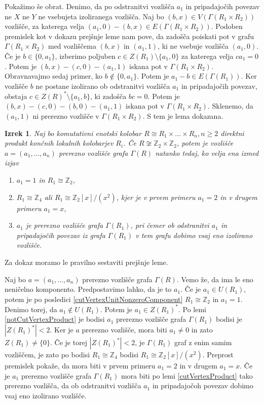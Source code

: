 \documentclass[a4paper, 12pt]{amsart}
\theoremstyle{definition} %
\theoremstyle{plain} %
\newtheorem{izrek}[definicija]{Izrek}
\newcommand{\Z}{\mathbb Z}
\begin{document}
Pokažimo še obrat. Denimo, da po odstranitvi vozlišča $a_1$ in pripadajočih povezav ne $X$ ne $Y$ ne vsebujeta izoliranega vozlišča. Naj bo $(b,x)\in V(\Gamma(R_1\times R_2))$ vozlišče, za katerega velja $(a_1,0) -(b,x) \in E(\Gamma(R_1\times R_2))$. Podoben premislek kot v dokazu prejšnje leme nam pove, da zadošča poiskati pot  v grafu $\Gamma(R_1 \times R_2)$ med vozliščema $(b,x)$ in $(a_1,1)$, ki ne vsebuje vozlišča $(a_1,0)$. Če je $b\in \{0,a_1\}$, izberimo poljuben $c\in Z(R_1) \setminus \{a_1,0\}$ za katerega velja $ca_1 = 0$. Potem je $(b,x) - (c,0) - (a_1,1)$ iskana pot v $\Gamma(R_1 \times R_2)$. Obravnavajmo sedaj primer, ko $b\notin \{0,a_1\}$. Potem je $a_1 -b\in E(\Gamma(R_1))$. Ker vozlišče $b$ ne postane izolirano ob odstranitvi vozlišča $a_1$ in pripadajočih povezav, obstaja $c\in Z(R)^*\setminus\{a_1,b\}$, ki zadošča $bc=0$. Potem je $(b,x)-(c,0)-(b,0)-(a_1,1)$ iskana pot v $\Gamma(R_1\times R_2)$. Sklenemo, da $(a_1,1)$  ni prerezno vozlišče v $\Gamma(R_1 \times R_2)$. S tem je lema dokazana. 
\endproof

\begin{izrek}
\label{cutVertexClassification}
Naj bo komutativni enotski kolobar $R\cong R_1\times \dots \times R_n, n\ge2$ direktni produkt končnih lokalnih kolobarjev $R_i$. Če $R\not\cong \Z_2 \times \Z_2$, potem je vozlišče $a=(a_1,\dots,a_n)$ prerezno vozlišče grafa $\Gamma(R)$ natanko tedaj, ko velja ena izmed  izjav
\begin{enumerate}
\item $a_1=1$ in $R_1 \cong \Z_2$,
\item $R_1\cong \Z_4$ ali $R_1\cong \Z_2[x]/(x^2)$, kjer je v prvem primeru $a_1=2$ in v drugem primeru $a_1 = x$,
\item $a_1$ je prerezno vozlišče grafa $\Gamma(R_1)$, pri čemer ob odstranitvi $a_1$ in pripadajočih povezav iz grafa $\Gamma(R_1)$ v tem grafu dobimo vsaj eno izolirano vozlišče.
\end{enumerate}
\end{izrek}

\proof
Za dokaz moramo le pravilno sestaviti prejšnje leme.

Naj bo $a=(a_1,\dots,a_n)$ prerezno vozlišče grafa $\Gamma(R)$. Vemo že, da ima le eno neničelno komponento. Predpostavimo lahko, da je to $a_1$. Če je $a_1\in U(R_1)$, potem je po posledici  \ref{cutVertexUnitNonzeroComponent} $R_1\cong \Z_2$ in $a_1 = 1$. Denimo torej, da $a_1 \notin U(R_1)$. Potem je $a_1 \in Z(R_1)^*$. Po lemi \ref{notCutVertexProduct} je bodisi $a_1$ prerezno vozlišče grafa $\Gamma(R_1)$ bodisi je $|Z(R_1)^*| < 2$. Ker je $a$ prerezno vozlišče, mora biti $a_1\neq 0$ in zato $Z(R_1) \neq \{0\}$. Če je torej $|Z(R_1)^*| < 2$, je $\Gamma(R_1)$ graf z enim samim vozliščem, je  zato po \cite{Anderson-klasifikacijaMalihGrafov} bodisi $R_1  \cong \Z_4$ bodisi $R_1  \cong \Z_2[x]/(x^2)$. Preprost premislek pokaže, da mora biti v prvem primeru $a_1 = 2$ in v drugem $a_1 = x$. Če  je $a_1$ prerezno vozlišče grafa $\Gamma(R_1)$ mora biti po lemi \ref{cutVertexProduct} tako prerezno vozlišča, da ob odstranitvi vozlišča $a_1$ in pripadajočoh povezav dobimo vsaj eno izolirano vozlišče.
\end{document}
